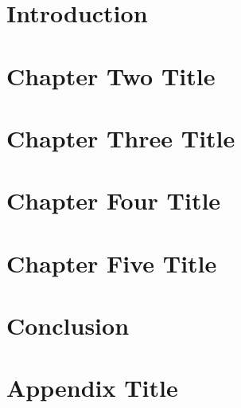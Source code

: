 \documentclass[12pt]{report}
\begin{document}
\tableofcontents

\chapter{Introduction}


\chapter{Chapter Two Title}


\chapter{Chapter Three Title}


\chapter{Chapter Four Title}


\chapter{Chapter Five Title}


\chapter{Conclusion}


\appendix
\chapter{Appendix Title}

\end{document}
